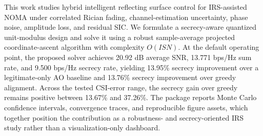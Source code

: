 This work studies hybrid intelligent reflecting surface control for IRS-assisted NOMA under correlated Rician fading, channel-estimation uncertainty, phase noise, amplitude loss, and residual SIC. We formulate a secrecy-aware quantized unit-modulus design and solve it using a robust sample-average projected coordinate-ascent algorithm with complexity $O(ISN)$. At the default operating point, the proposed solver achieves 20.92 dB average SNR, 13.771 bps/Hz sum rate, and 9.500 bps/Hz secrecy rate, yielding 13.95\% secrecy improvement over a legitimate-only AO baseline and 13.76\% secrecy improvement over greedy alignment. Across the tested CSI-error range, the secrecy gain over greedy remains positive between 13.67\% and 37.26\%. The package reports Monte Carlo confidence intervals, convergence traces, and reproducible figure assets, which together position the contribution as a robustness- and secrecy-oriented IRS study rather than a visualization-only dashboard.
